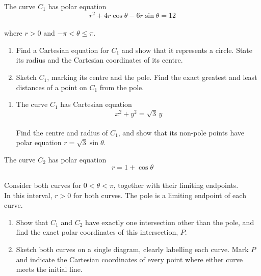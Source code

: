 \documentclass[leqno]{article}
\begin{document}
\begin{enumerate}[
  label=\textbf{\arabic*.},
  leftmargin=*,
  topsep=0pt,
  partopsep=0pt,
  parsep=0pt
]
\newpage

\questionitem

The curve $C_1$ has polar equation
\[
r^2+4r\cos\theta-6r\sin\theta=12
\] \\
where $r>0$ and $-\pi<\theta\leq\pi$. \\
\begin{enumerate}[label=\textbf{(\alph*)}]
\item Find a Cartesian equation for $C_1$ and show that it represents a circle. State its radius and the Cartesian coordinates of its centre.  \\
\item Sketch $C_1$, marking its centre and the pole. Find the exact greatest and least distances of a point on $C_1$ from the pole.  \\
\end{enumerate}

\newpage

\questionitem

\begin{enumerate}[label=\textbf{(\alph*)}]
\item The curve $C_1$ has Cartesian equation
\[
x^2+y^2=\sqrt{3}\,y
\] \\
Find the centre and radius of $C_1$, and show that its non-pole points have polar equation $r=\sqrt{3}\sin\theta$.  \\
\end{enumerate}
The curve $C_2$ has polar equation
\[
r=1+\cos\theta
\] \\
Consider both curves for $0<\theta<\pi$, together with their limiting endpoints. \\
In this interval, $r>0$ for both curves. The pole is a limiting endpoint of each curve. \\
\begin{enumerate}[label=\textbf{(\alph*)}, resume]
\item Show that $C_1$ and $C_2$ have exactly one intersection other than the pole, and find the exact polar coordinates of this intersection, $P$.  \\
\item Sketch both curves on a single diagram, clearly labelling each curve. Mark $P$ and indicate the Cartesian coordinates of every point where either curve meets the initial line.  \\
\end{enumerate}


\end{enumerate}
\end{document}
